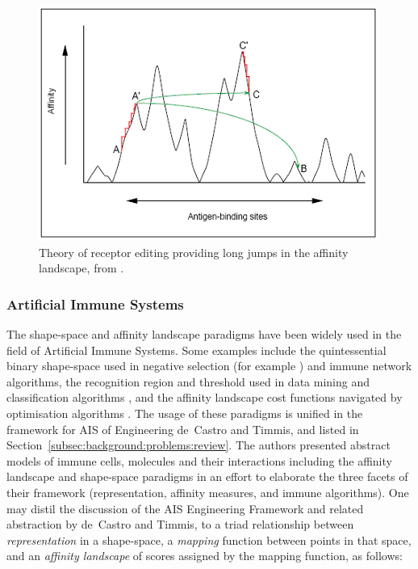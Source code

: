 \begin{figure}[ht]
	\centering
	\includegraphics[scale=0.65]{ClonalSelection/theory-affinitylandscape}
	\caption{Theory of receptor editing providing long jumps in the affinity landscape, from \cite{George1999}.}
	\label{pic:theory:affinitylandscape}
\end{figure}

%
%
\subsubsection{Artificial Immune Systems}
\label{subsubsec:cs:theory:ais}
The shape-space and affinity landscape paradigms have been widely used in the field of Artificial Immune Systems. Some examples include the quintessential binary shape-space used in negative selection (for example \cite{Stibor2005}) and immune network algorithms, the recognition region and threshold used in data mining and classification algorithms \cite{Watkins2001, Watkins2004a, Knight2005}, and the affinity landscape cost functions navigated by optimisation algorithms \cite{White2003, Castro2002}. The usage of these paradigms is unified in the framework for AIS of Engineering de~Castro and Timmis, and listed in Section~\ref{subsec:background:problems:review}. The authors presented abstract models of immune cells, molecules and their interactions including the affinity landscape and shape-space paradigms in an effort to elaborate the three facets of their framework (representation, affinity measures, and immune algorithms). One may distil the discussion of the AIS Engineering Framework and related abstraction by de~Castro and Timmis, to a triad relationship between \emph{representation} in a shape-space, a \emph{mapping} function between points in that space, and an \emph{affinity landscape} of scores assigned by the mapping function, as follows:


